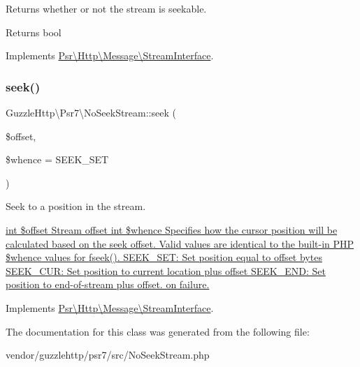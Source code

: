 Returns whether or not the stream is seekable.

\begin{DoxyReturn}{Returns}
bool 
\end{DoxyReturn}


Implements \hyperlink{interfacePsr_1_1Http_1_1Message_1_1StreamInterface_ad4a27548fd51bd12390d798981a1622b}{Psr\textbackslash{}\+Http\textbackslash{}\+Message\textbackslash{}\+Stream\+Interface}.

\mbox{\label{classGuzzleHttp_1_1Psr7_1_1NoSeekStream_a615df46cc187cca2b0f9ffac86a1d83e}} 
\subsubsection{\texorpdfstring{seek()}{seek()}}
{\footnotesize\ttfamily Guzzle\+Http\textbackslash{}\+Psr7\textbackslash{}\+No\+Seek\+Stream\+::seek (\begin{DoxyParamCaption}\item[{}]{\$offset,  }\item[{}]{\$whence = {\ttfamily SEEK\+\_\+SET} }\end{DoxyParamCaption})}

Seek to a position in the stream.

\hyperlink{}{int \$offset Stream offset  int \$whence Specifies how the cursor position will be calculated based on the seek offset. Valid values are identical to the built-\/in P\+HP \$whence values for {\ttfamily fseek()}. S\+E\+E\+K\+\_\+\+S\+E\+T\+: Set position equal to offset bytes S\+E\+E\+K\+\_\+\+C\+U\+R\+: Set position to current location plus offset S\+E\+E\+K\+\_\+\+E\+N\+D\+: Set position to end-\/of-\/stream plus offset.   on failure. }

Implements \hyperlink{interfacePsr_1_1Http_1_1Message_1_1StreamInterface_a96ee062dc6cf4022d655dd15eaa81208}{Psr\textbackslash{}\+Http\textbackslash{}\+Message\textbackslash{}\+Stream\+Interface}.



The documentation for this class was generated from the following file\+:\begin{DoxyCompactItemize}
\item 
vendor/guzzlehttp/psr7/src/No\+Seek\+Stream.\+php\end{DoxyCompactItemize}
